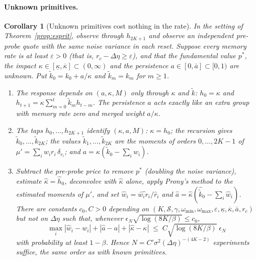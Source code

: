 \documentclass[12pt]{article}
\newtheorem{corollary}[theorem]{Corollary}
\theoremstyle{definition}
\theoremstyle{remark}
\begin{document}
\paragraph{Unknown primitives.}
\begin{corollary}[Unknown primitives cost nothing in the rate]
\label{cor:unknown_primitives}
In the setting of Theorem~\ref{prop:esprit}, observe through $h_{2K+1}$ and observe an independent pre-probe quote with the same noise variance in each reset. Suppose every memory rate is at least $\varepsilon>0$ (that is, $r_c-\Delta\eta\ge\varepsilon$), and that the fundamental value $p^*$, the impact $\kappa\in[\underline\kappa,\overline\kappa]\subset(0,\infty)$ and the persistence $a\in[0,\bar a]\subset[0,1)$ are unknown. Put $\tilde k_0=k_0+a/\kappa$ and $\tilde k_m=k_m$ for $m\ge1$.
\begin{enumerate}[label=(\roman*)]
\item The response depends on $(a,\kappa,M)$ only through $\kappa$ and $\tilde k$: $h_0=\kappa$ and $h_{t+1}=\kappa\sum_{m=0}^{t}\tilde k_mh_{t-m}$. The persistence $a$ acts exactly like an extra group with memory rate zero and merged weight $a/\kappa$.
\item The taps $h_0,\ldots,h_{2K+1}$ identify $(\kappa,a,M)$: $\kappa=h_0$; the recursion gives $\tilde k_0,\ldots,\tilde k_{2K}$; the values $\tilde k_1,\ldots,\tilde k_{2K}$ are the moments of orders $0,\ldots,2K-1$ of $\mu'=\sum_iw_ir_i\,\delta_{r_i}$; and $a=\kappa(\tilde k_0-\sum_iw_i)$.
\item Subtract the pre-probe price to remove $p^*$ (doubling the noise variance), estimate $\hat\kappa=\hat h_0$, deconvolve with $\hat\kappa$ alone, apply Prony's method to the estimated moments of $\mu'$, and set $\hat w_i=\widehat{w_ir_i}/\hat r_i$ and $\hat a=\hat\kappa(\hat{\tilde k}_0-\sum_i\hat w_i)$. There are constants $c_0,C>0$ depending on $(K,\mathcal S,\gamma,\omega_{\min},\omega_{\max},\varepsilon,\underline\kappa,\overline\kappa,\bar a,r_c)$ but not on $\Delta\eta$ such that, whenever $\epsilon_N\sqrt{\log(8K/\beta)}\le c_0$,
\[
\max_i|\hat w_i-w_i|+|\hat a-a|+|\hat\kappa-\kappa|\;\le\;C\sqrt{\log(8K/\beta)}\;\epsilon_N
\]
with probability at least $1-\beta$. Hence $N=C'\sigma^2(\Delta\eta)^{-(4K-2)}$ experiments suffice, the same order as with known primitives.
\end{enumerate}
\end{corollary}
\end{document}
